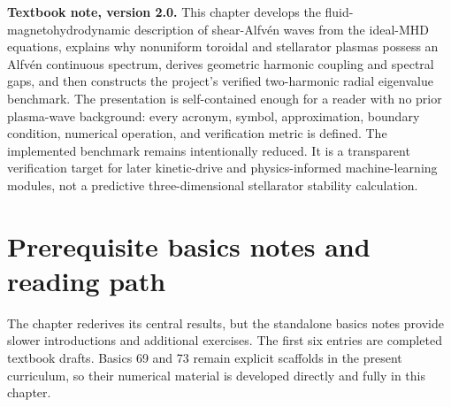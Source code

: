 \documentclass[11pt]{article}
\begin{document}

\begin{overviewbox}
\textbf{Textbook note, version 2.0.} This chapter develops the fluid-magnetohydrodynamic description of shear-Alfv\'en waves from the ideal-MHD equations, explains why nonuniform toroidal and stellarator plasmas possess an Alfv\'en continuous spectrum, derives geometric harmonic coupling and spectral gaps, and then constructs the project's verified two-harmonic radial eigenvalue benchmark. The presentation is self-contained enough for a reader with no prior plasma-wave background: every acronym, symbol, approximation, boundary condition, numerical operation, and verification metric is defined. The implemented benchmark remains intentionally reduced. It is a transparent verification target for later kinetic-drive and physics-informed machine-learning modules, not a predictive three-dimensional stellarator stability calculation.
\end{overviewbox}

\ProjectTOC

\section*{Prerequisite basics notes and reading path}
The chapter rederives its central results, but the standalone basics notes provide slower introductions and additional exercises. The first six entries are completed textbook drafts. Basics 69 and 73 remain explicit scaffolds in the present curriculum, so their numerical material is developed directly and fully in this chapter.
\end{document}
